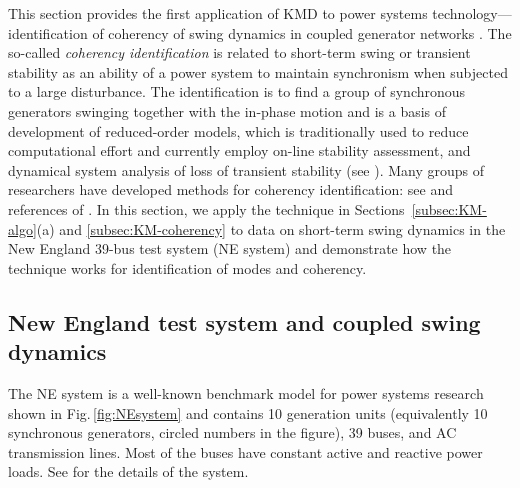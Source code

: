 \documentclass[a4paper,10pt]{article}
\begin{document}
This section provides the first application of KMD to power systems technology---identification of coherency of swing dynamics in coupled generator networks \cite{Susuki_IEEETPWRS26}.   
The so-called \emph{coherency identification} is related to short-term swing or transient stability as an ability of a power system to maintain synchronism when subjected to a large disturbance.  
The identification is to find a group of synchronous generators swinging together with the in-phase motion and is a basis of development of reduced-order models, which is traditionally used to reduce computational effort and currently employ on-line stability assessment, and dynamical system analysis of loss of transient stability (see \cite{Susuki_JNLS09}).  
Many groups of researchers have developed methods for coherency identification:  see \cite{Podmore_IEEETPAS97,Avramovic_AUTO16,Winkelman_IEEETPAS100,Yusof_IEEETPS8,Sastry_IEEETAC26,Anaparthi_IEEETPS20} and references of \cite{Susuki_IEEETPWRS26}.  
In this section, we apply the technique in Sections~\ref{subsec:KM-algo}(a) and \ref{subsec:KM-coherency} to data on short-term swing dynamics in the New England 39-bus test system (NE system) \cite{Pai:1989} and demonstrate how the technique works for identification of modes and coherency.  


\subsection{New England test system and coupled swing dynamics}
\label{subsec:coherency-NE}

The NE system is a well-known benchmark model for power systems research shown in Fig.\,\ref{fig:NEsystem} and contains 10 generation units (equivalently 10 synchronous generators, circled numbers in the figure), 39 buses, and AC transmission lines.  
Most of the buses have constant active and reactive power loads.   
See \cite{Pai:1989} for the details of the system.  
\end{document}
